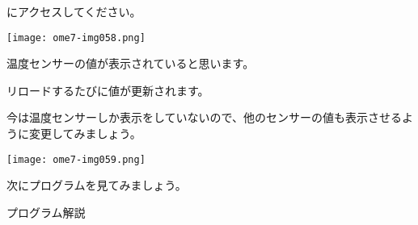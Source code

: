 にアクセスしてください。


%


\centering
\texttt{[image: ome7-img058.png]}
\flushleft


温度センサーの値が表示されていると思います。

リロードするたびに値が更新されます。

今は温度センサーしか表示をしていないので、他のセンサーの値も表示させるように変更してみましょう。

%


\centering
\texttt{[image: ome7-img059.png]}
\flushleft

次にプログラムを見てみましょう。


\clearpage
\noindent プログラム解説

